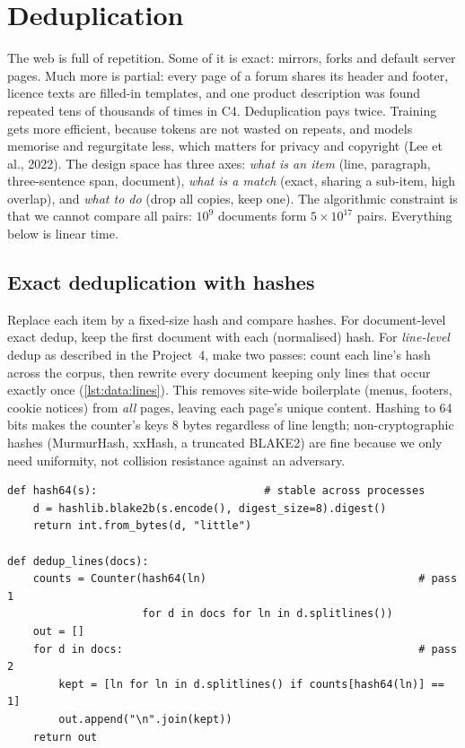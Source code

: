 \section{Deduplication}\label{sec:data:dedup}

The web is full of repetition. Some of it is exact: mirrors, forks and default server pages.
Much more is partial: every page of a forum shares its header and footer, licence texts are
filled-in templates, and one product description was found repeated tens of thousands of times in
C4. Deduplication pays twice. Training gets more efficient, because tokens are not wasted on
repeats, and models memorise and regurgitate less, which matters for privacy and copyright (Lee
et al., 2022). The design space has three axes: \emph{what is an item} (line, paragraph,
three-sentence span, document), \emph{what is a match} (exact, sharing a sub-item, high overlap),
and \emph{what to do} (drop all copies, keep one). The algorithmic constraint is that we cannot
compare all pairs: $10^{9}$ documents form $5\times10^{17}$ pairs. Everything below is linear
time.

\subsection{Exact deduplication with hashes}\label{sec:data:exact}

Replace each item by a fixed-size hash and compare hashes. For document-level exact dedup, keep
the first document with each (normalised) hash. For \emph{line-level} dedup as described in the
Project~4, make two passes: count each line's hash across the corpus, then rewrite every
document keeping only lines that occur exactly once (\cref{lst:data:lines}). This removes
site-wide boilerplate (menus, footers, cookie notices) from \emph{all} pages, leaving each page's
unique content. Hashing to 64 bits makes the counter's keys 8 bytes regardless of line length;
non-cryptographic hashes (MurmurHash, xxHash, a truncated BLAKE2) are fine because we only need
uniformity, not collision resistance against an adversary.

\begin{lstlisting}[caption={Two-pass exact line deduplication (simplified from \code{llmsys/datapipe/dedup.py}, which also offers a keep-first policy).},label={lst:data:lines}]
def hash64(s):                          # stable across processes
    d = hashlib.blake2b(s.encode(), digest_size=8).digest()
    return int.from_bytes(d, "little")

def dedup_lines(docs):
    counts = Counter(hash64(ln)                                 # pass 1
                     for d in docs for ln in d.splitlines())
    out = []
    for d in docs:                                              # pass 2
        kept = [ln for ln in d.splitlines() if counts[hash64(ln)] == 1]
        out.append("\n".join(kept))
    return out
\end{lstlisting}

